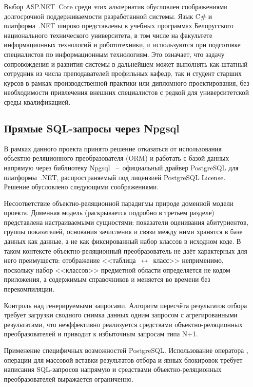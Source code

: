 Выбор ASP.NET~Core среди этих альтернатив обусловлен соображениями долгосрочной поддерживаемости разработанной системы.
Язык C\# и платформа~.NET широко представлены в учебных программах Белорусского национального технического университета, в том числе на факультете информационных технологий и робототехники, и используются при подготовке специалистов по информационным технологиям.
Это означает, что задачу сопровождения и развития системы в дальнейшем может выполнять как штатный сотрудник из числа преподавателей профильных кафедр, так и студент старших курсов в рамках производственной практики или дипломного проектирования, без необходимости привлечения внешних специалистов с редкой для университетской среды квалификацией.

\subsection{Прямые SQL-запросы через Npgsql}

В рамках данного проекта принято решение отказаться от использования объектно-реляционного преобразователя (ORM) и работать с базой данных напрямую через библиотеку Npgsql ~--~официальный драйвер PostgreSQL для платформы~.NET, распространяемый под лицензией PostgreSQL License.
Решение обусловлено следующими соображениями.

Несоответствие объектно-реляционной парадигмы природе доменной модели проекта.
Доменная модель (раскрывается подробно в третьем разделе) представлена настраиваемыми сущностями: показатели оценивания абитуриентов, группы показателей, основания зачисления и связи между ними хранятся в базе данных как данные, а не как фиксированный набор классов в исходном коде.
В таком контексте объектно-реляционный преобразователь не даёт характерных для него преимуществ: отображение <<таблица~$\leftrightarrow$~класс>> неприменимо, поскольку набор <<классов>> предметной области определяется не кодом приложения, а содержимым справочников и меняется во времени без перекомпиляции.

Контроль над генерируемыми запросами.
Алгоритм пересчёта результатов отбора требует загрузки сводного снимка данных одним запросом с агрегированными результатами, что неэффективно реализуется средствами объектно-реляционных преобразователей и приводит к избыточным запросам типа N+1.

Применение специфичных возможностей PostgreSQL.
Использование оператора , операции  для массовой вставки результатов отбора и явных блокировок  требует написания SQL-запросов напрямую и средствами объектно-реляционных преобразователей выражается ограниченно.

